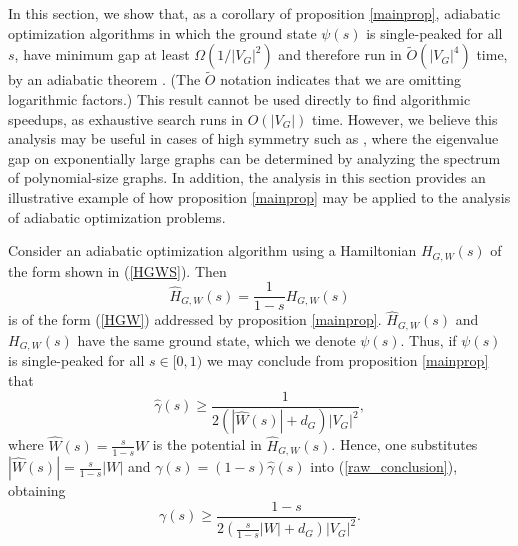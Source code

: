 In this section, we show that, as a corollary of proposition
\ref{mainprop}, adiabatic optimization algorithms in which the ground
state $\psi(s)$ is single-peaked for all $s$, have minimum gap at
least $\Omega(1/|V_G|^2)$ and therefore run in
$\widetilde{O}(|V_G|^4)$ time, by an adiabatic theorem
\cite{Elgart_Hagedorn}. (The $\widetilde{O}$ notation indicates that we
are omitting logarithmic factors.) This result cannot be used directly
to find algorithmic speedups, as exhaustive search runs in $O(|V_G|)$
time. However, we believe this analysis may be useful in cases of high
symmetry such as \cite{R04, DMV01, FGG02}, where the eigenvalue gap
on exponentially large graphs can be determined by analyzing the spectrum
of polynomial-size graphs. In addition, the analysis in this section
provides an illustrative example of how proposition \ref{mainprop} may
be applied to the analysis of adiabatic optimization problems.

Consider an adiabatic optimization algorithm using a Hamiltonian
$H_{G,W}(s)$ of the form shown in (\ref{HGWS}). Then 
\begin{equation}
\hat{H}_{G,W}(s) = \frac{1}{1-s} H_{G,W}(s)
\end{equation}
is of the form (\ref{HGW}) addressed by proposition
\ref{mainprop}. $\hat{H}_{G,W}(s)$ and $H_{G,W}(s)$ have the same
ground state, which we denote $\psi(s)$. Thus, if $\psi(s)$ is
single-peaked for all $s \in [0,1)$ we may conclude from proposition
\ref{mainprop} that
\begin{equation}
\label{raw_conclusion}
\hat{\gamma}(s) \geq \frac{1}{2 \left( |\hat{W}(s)|+d_G \right) |V_G|^2},
\end{equation}
where $\hat{W}(s) = \frac{s}{1-s}W$ is the potential in
$\hat{H}_{G,W}(s)$. Hence, one substitutes $|\hat{W}(s)| =
\frac{s}{1-s} |W|$ and $\gamma(s) = (1-s) \hat{\gamma}(s)$ into
(\ref{raw_conclusion}), obtaining 
\begin{equation}
\label{gammabound}
\gamma(s) \geq \frac{1-s}{2 \left( \frac{s}{1-s} |W| + d_G \right)
  |V_G|^2}.
\end{equation} 

